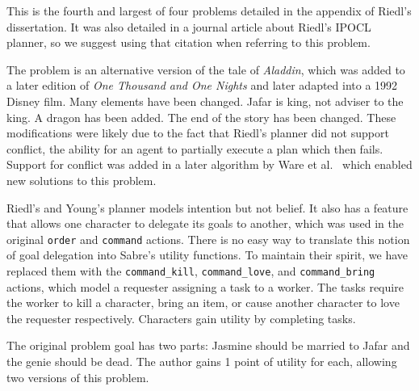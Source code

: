 \documentclass{nilreport}
\makeatletter
\renewcommand{\bibentry}[1]{\nocite{#1}{\frenchspacing\@nameuse{BR@r@#1\@extra@b@citeb}}}
\makeatother
\begin{document}
This is the fourth and largest of four problems detailed in the appendix
of Riedl's dissertation. It was also detailed in a journal article
about Riedl's IPOCL planner, so we suggest using that citation when
referring to this problem.

\begin{quote}
	\bibentry{riedl2010narrative}
\end{quote}

\noindent The problem is an alternative version of the tale of \emph{Aladdin},
which was added to a later edition of \emph{One Thousand and One Nights}
and later adapted into a 1992 Disney film. Many elements have been
changed. Jafar is king, not adviser to the king. A dragon has been
added. The end of the story has been changed. These modifications
were likely due to the fact that Riedl's planner did not support conflict,
the ability for an agent to partially execute a plan which then fails.
Support for conflict was added in a later algorithm by Ware et al.~\cite{ware2014conflict}
which enabled new solutions to this problem.

Riedl's and Young's planner models intention but not belief. It also
has a feature that allows one character to delegate its goals to another,
which was used in the original \texttt{order} and \texttt{command}
actions. There is no easy way to translate this notion of goal delegation
into Sabre's utility functions. To maintain their spirit, we have
replaced them with the \texttt{command\_kill}, \texttt{command\_love},
and \texttt{command\_bring} actions, which model a requester assigning
a task to a worker. The tasks require the worker to kill a character,
bring an item, or cause another character to love the requester respectively.
Characters gain utility by completing tasks.

The original problem goal has two parts: Jasmine should be married
to Jafar and the genie should be dead. The author gains 1 point of
utility for each, allowing two versions of this problem.

\medskip{}
\noindent{}
\end{document}

